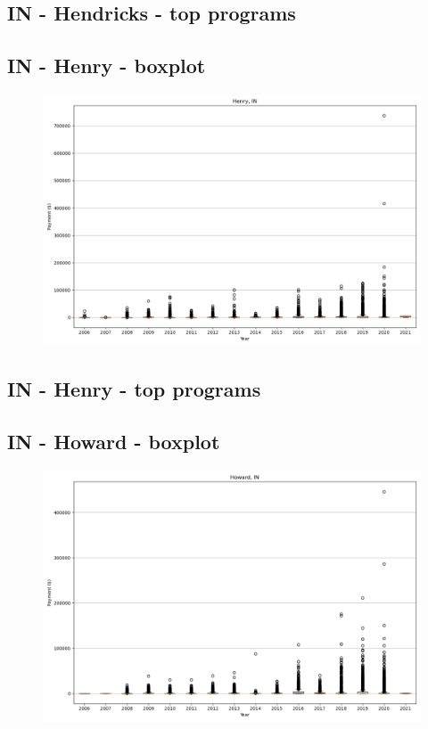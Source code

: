 \subsection*{IN - Hendricks - top programs}

\newpage
\subsection*{IN - Henry - boxplot}
\begin{figure}[h]
\centering
\includegraphics[width=7in]{../output/boxplots/counties/Henry-IN_boxplot.png}
\end{figure}


\subsection*{IN - Henry - top programs}

\newpage
\subsection*{IN - Howard - boxplot}
\begin{figure}[h]
\centering
\includegraphics[width=7in]{../output/boxplots/counties/Howard-IN_boxplot.png}
\end{figure}


